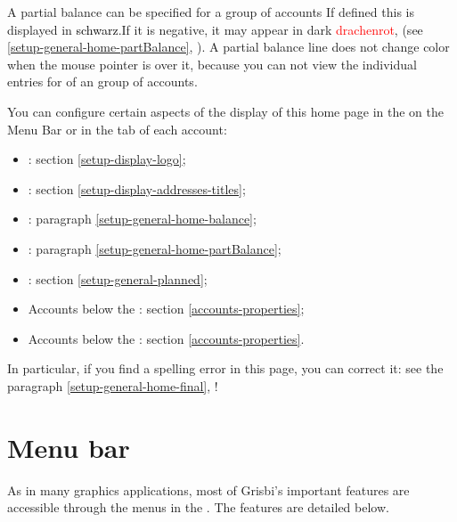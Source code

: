 A partial balance can be specified for a group of accounts  If defined this is displayed in \textcolor{black}{schwarz}.If it is negative, it may appear in dark \textcolor{red}{drachenrot}, (see  \vref{setup-general-home-partBalance}, ). A partial balance line does not change color when the mouse pointer is over it, because you can not view the individual entries for of an group of accounts.

You can configure certain aspects of the display of this home page in the  on the Menu Bar or in the  tab of each account:
\begin{itemize}
	 \item {}: section \vref{setup-display-logo};
	 \item {}: section \vref{setup-display-addresses-titles};
	 \item {}: paragraph \vref{setup-general-home-balance};
	 \item {}: paragraph \vref{setup-general-home-partBalance};
	 \item {}: section \vref{setup-general-planned};
	 \item Accounts below the : section \vref{accounts-properties};
	 \item Accounts below the : section  \vref{accounts-properties}.
\end{itemize}

In particular, if you find a spelling error in this page, you can correct it: see the paragraph \vref{setup-general-home-final},  !


\section{Menu bar\label{home-menus}}

As in many graphics applications, most of Grisbi's important features are accessible through the menus in the . The features are detailed below.



